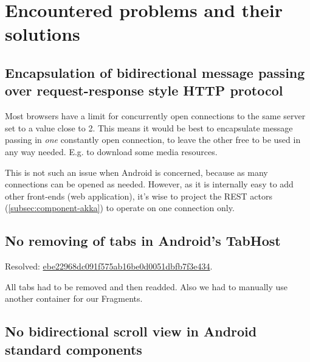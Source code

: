 
\section{Encountered problems and their solutions}
\label{sec:impl-problems}

\subsection{Encapsulation of bidirectional message passing over request-response style HTTP protocol}
\label{subsec:problem-longpolling}


Most browsers have a limit for concurrently open connections to the same server set to a value close to 2. This means it would be best to encapsulate message passing in \emph{one} constantly open connection, to leave the other free to be used in any way needed. E.g. to download some media resources.

This is not such an issue when Android is concerned, because as many connections can be opened as needed. However, as it is internally easy to add other front-ends (web application), it's wise to project the REST actors (\cref{subsec:component-akka}) to operate on one connection only.

\subsection{No removing of tabs in Android's TabHost}
\label{subsec:problem-tabhost}


Resolved: \href{https://github.com/michalrus/agh-mindmap/commit/ebe22968dc091f575ab16be0d0051dbfb7f3e434}{ebe22968dc091f575ab16be0d0051dbfb7f3e434}.

All tabs had to be removed and then readded. Also we had to manually use another container for our Fragments.

\subsection{No bidirectional scroll view in Android standard components}
\label{subsec:problem-scrollview}

